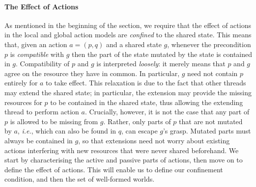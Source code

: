 \paragraph{The Effect of Actions} As mentioned in the beginning of the section, we require that the effect of actions in the local and global action models are \emph{confined} to the shared state. This means that, given an action $a = (p,q)$ and a shared state $g$, whenever the precondition $p$ is \emph{compatible} with $g$ then the part of the state mutated by the state is contained in $g$. Compatibility of $p$ and $g$ is interpreted \emph{loosely}: it merely means that $p$ and $g$ agree on the resource they have in common. In particular, $g$ need not contain $p$ entirely for $a$ to take effect. This relaxation is due to the fact that other threads may extend the shared state; in particular, the extension may provide the missing resources for $p$ to be contained in the shared state, thus allowing the extending thread to perform action $a$. Crucially, however, it is not the case that any part of $p$ is allowed to be missing from $g$. Rather, only parts of $p$ that are not mutated by $a$, \textit{i.e.}, which can also be found in $q$, can escape $g$'s grasp. Mutated parts must always be contained in $g$, so that extensions need not worry about existing actions interfering with new resources that were never shared beforehand. We start by characterising the active and passive parts of actions, then move on to define the effect of actions. This will enable us to define our confinement condition, and then the set of
well-formed worlds.


